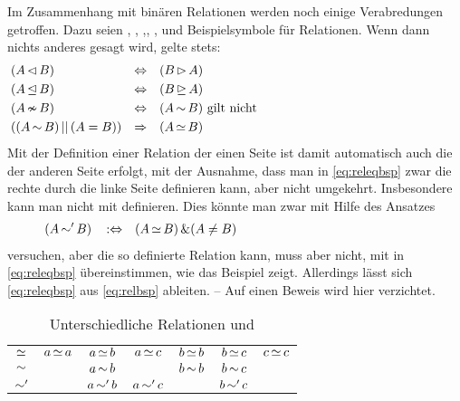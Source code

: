 Im Zusammenhang mit binären Relationen werden noch einige Verabredungen getroffen.
Dazu seien , , ,, ,  und  Beispielsymbole für Relationen.
Wenn dann nichts anderes gesagt wird, gelte stets:
\begin{align}
	& (A \operatorname{\lhd}   B)                   & \operatorname{\Leftrightarrow} & \quad (B \operatorname{\rhd}   A)
	\label{eq:lrrelbsp}   \\
	& (A \operatorname{\unlhd} B)                   & \operatorname{\Leftrightarrow} & \quad (B \operatorname{\unrhd} A)
	\label{eq:lrreleqbsp} \\
	&  (A \operatorname{\nsim}  B)                   & \operatorname{\Leftrightarrow} & \quad (A \operatorname{\sim}    B)
	\text{ gilt nicht}
	\label{eq:relnbsp}    \\
	& ((A \operatorname{\sim}   B) \operatorname{||\,} (A = B)) & \operatorname{\Rightarrow}   & \quad (A \operatorname{\simeq}  B)
	\label{eq:releqbsp}   &&&&&&&&&&&&&&&&&&&&&&&&&&&&&&
\end{align}
%
Mit der Definition einer Relation der einen Seite ist damit automatisch auch die der anderen Seite erfolgt, mit der Ausnahme, dass man in \eqref{eq:releqbsp} zwar die rechte durch die linke Seite definieren kann, aber nicht umgekehrt.
Insbesondere kann man \symqt{$\relbsp$} nicht mit \symqt{$\releqbsp$} definieren.
Dies könnte man zwar mit Hilfe des Ansatzes
\begin{align}
	& (A \operatorname{\sim}' B) && \operatorname{:\!\Leftrightarrow} & (A \operatorname{\simeq} B) \operatorname{\&} (A \ne B)
	\label{eq:relbsp} &&&&&&&&&&&&&&&&&&&&&&&&&&&&&&
\end{align}
versuchen, aber die so definierte Relation  kann, muss aber nicht, mit \symqt{$\relbsp$} in \eqref{eq:releqbsp} übereinstimmen, wie das Beispiel  zeigt.
Allerdings lässt sich \eqref{eq:releqbsp} aus \eqref{eq:relbsp} ableiten.
-- Auf einen Beweis wird hier verzichtet.

\begin{table}[!htb]
	\setlength\extrarowheight{1.5pt}
	\begin{center}
		\begin{tabularx}{8.4cm}{|c|cccccc|}
			\hline                $   \releqbsp   $
			& $ a \operatorname{\simeq} a $ & $ a \operatorname{\simeq} b $ & $ a \operatorname{\simeq} c $
			& $ b \operatorname{\simeq} b $ & $ b \operatorname{\simeq} c $ & $ c \operatorname{\simeq} c $
			\\                    $   \relbsp     $
			&                   & $ a \operatorname{\sim}   b $ &
			& $ b \operatorname{\sim}   b $ & $ b \operatorname{\sim}   c $ &
			\\                    $   \operatorname{\sim}'    $
			&                   & $ a \operatorname{\sim}'  b $ & $ a \operatorname{\sim}'  c $
			&                   & $ b \operatorname{\sim}'  c $ &
			\\ \hline
		\end{tabularx}
		\caption{Unterschiedliche Relationen \symqt{$\relbsp$} und  }
		\label{tab:Gegenbeispiel}%
	\end{center}
\end{table}

